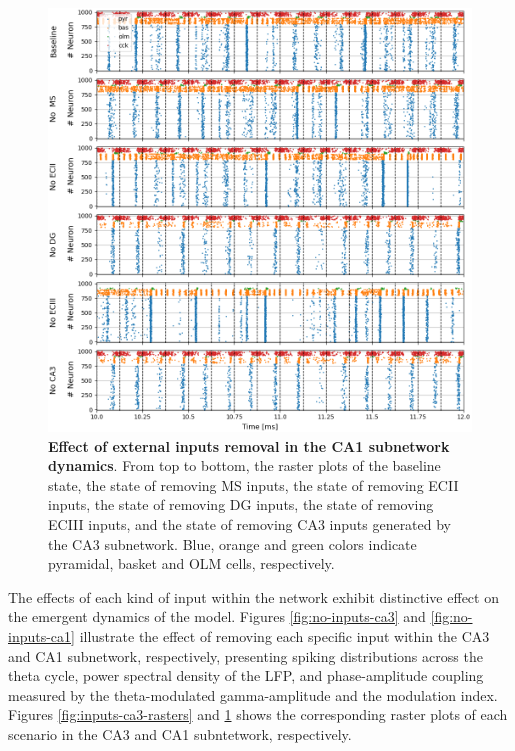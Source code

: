 \documentclass[../main.tex]{subfiles}
\begin{document}
\begin{figure}[htbp]
    \centering    
    \includegraphics[width=\textwidth]{chapter4/figures/removing_external_inputs/removing_inputs_ca1_rasters.png}
    \caption{\textbf{Effect of external inputs removal in the CA1 subnetwork dynamics}.
    From top to bottom, the raster plots of the baseline state, the state of removing MS inputs, the state of removing ECII inputs, the state of removing DG inputs, the state of removing ECIII inputs, and the state of removing CA3 inputs generated by the CA3 subnetwork.
    Blue, orange and green colors indicate pyramidal, basket and OLM cells, respectively.}
    \label{fig:inputs-ca1-rasters}
\end{figure}
The effects of each kind of input within the network exhibit distinctive effect on the emergent dynamics of the model.
Figures \ref{fig:no-inputs-ca3} and \ref{fig:no-inputs-ca1} illustrate the effect of removing each specific input within the CA3 and CA1 subnetwork, respectively, presenting spiking distributions across the theta cycle, power spectral density of the LFP, and phase-amplitude coupling measured by the theta-modulated gamma-amplitude and the modulation index.
Figures \ref{fig:inputs-ca3-rasters} and \ref{fig:inputs-ca1-rasters} shows the corresponding raster plots of each scenario in the CA3 and CA1 subntetwork, respectively. 
\end{document}
